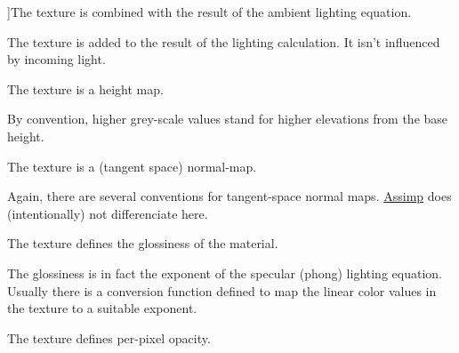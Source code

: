 \begin{Desc}
\begin{description}
{}]The texture is combined with the result of the ambient lighting equation. \item[{\em 
\hypertarget{namespaceassimp_1_1material_a034b83e48ea4f51696e276d3d5403f1bab790f63a2ce3ddf214dc549567c72479}{E\+M\+I\+S\+S\+I\+V\+E}\label{namespaceassimp_1_1material_a034b83e48ea4f51696e276d3d5403f1bab790f63a2ce3ddf214dc549567c72479}
}]The texture is added to the result of the lighting calculation. It isn't influenced by incoming light. \item[{\em 
\hypertarget{namespaceassimp_1_1material_a034b83e48ea4f51696e276d3d5403f1bae0a5d182350c94f7525199b5dd3137f1}{H\+E\+I\+G\+H\+T}\label{namespaceassimp_1_1material_a034b83e48ea4f51696e276d3d5403f1bae0a5d182350c94f7525199b5dd3137f1}
}]The texture is a height map.

By convention, higher grey-\/scale values stand for higher elevations from the base height. \item[{\em 
\hypertarget{namespaceassimp_1_1material_a034b83e48ea4f51696e276d3d5403f1baa8bdf8dd08766359fa2125fc702808bc}{N\+O\+R\+M\+A\+L\+S}\label{namespaceassimp_1_1material_a034b83e48ea4f51696e276d3d5403f1baa8bdf8dd08766359fa2125fc702808bc}
}]The texture is a (tangent space) normal-\/map.

Again, there are several conventions for tangent-\/space normal maps. \hyperlink{class_assimp}{Assimp} does (intentionally) not differenciate here. \item[{\em 
\hypertarget{namespaceassimp_1_1material_a034b83e48ea4f51696e276d3d5403f1ba1e1bb05c8c1ccf2aa4186a40b4ca787c}{S\+H\+I\+N\+I\+N\+E\+S\+S}\label{namespaceassimp_1_1material_a034b83e48ea4f51696e276d3d5403f1ba1e1bb05c8c1ccf2aa4186a40b4ca787c}
}]The texture defines the glossiness of the material.

The glossiness is in fact the exponent of the specular (phong) lighting equation. Usually there is a conversion function defined to map the linear color values in the texture to a suitable exponent. \item[{\em 
\hypertarget{namespaceassimp_1_1material_a034b83e48ea4f51696e276d3d5403f1ba2789759c7845fda949a3ae0a48457669}{O\+P\+A\+C\+I\+T\+Y}\label{namespaceassimp_1_1material_a034b83e48ea4f51696e276d3d5403f1ba2789759c7845fda949a3ae0a48457669}
}]The texture defines per-\/pixel opacity.


\end{description}
\end{Desc}
